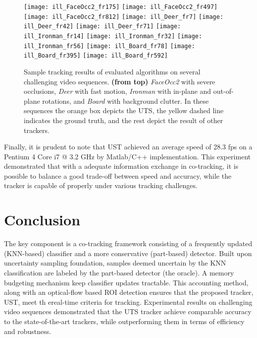 \documentclass[conference,twoside]{IEEEtran}
\begin{document}
\begin{figure}[!t]
\centering
\texttt{[image: ill\_FaceOcc2\_fr175]}
\texttt{[image: ill\_FaceOcc2\_fr497]}
\texttt{[image: ill\_FaceOcc2\_fr812]}
\texttt{[image: ill\_Deer\_fr7]}
\texttt{[image: ill\_Deer\_fr42]}
\texttt{[image: ill\_Deer\_fr71]}
\texttt{[image: ill\_Ironman\_fr14]}
\texttt{[image: ill\_Ironman\_fr32]}
\texttt{[image: ill\_Ironman\_fr56]}
\texttt{[image: ill\_Board\_fr78]}
\texttt{[image: ill\_Board\_fr395]}
\texttt{[image: ill\_Board\_fr592]}
\caption{Sample tracking results of evaluated algorithms on several challenging video sequences. \textbf{(from top)} \textit{FaceOcc2} with severe occlusions, \textit{Deer} with fast motion, \textit{Ironman} with in-plane and out-of-plane rotations, and \textit{Board} with background clutter.  In these sequences the orange box depicts the UTS, the yellow dashed line indicates the ground truth, and the rest depict the result of other trackers.}
\label{fig:eval_qual}
\vspace{-0.7 cm}
\end{figure}

Finally, it is prudent to note that UST achieved an average speed of 28.3 fps on a Pentium 4 Core i7 @ 3.2 GHz by Matlab/C++ implementation.%
This experiment demonstrated that with a adequate information exchange in co-tracking, it is possible to balance a good trade-off between speed and accuracy, while the tracker is capable of properly under various tracking challenges.

\section{Conclusion}
\label{sect:conclusion}
The key component is a co-tracking framework consisting of a frequently updated (KNN-based) classifier and a more conservative (part-based) detector. Built upon uncertainty sampling foundation, samples deemed uncertain by the KNN classification are labeled by the part-based detector (the oracle). A memory budgeting mechanism keep classifier updates tractable. This accounting method, along with an optical-flow based ROI detection ensures that the proposed tracker, UST, meet th ereal-time criteria for tracking. Experimental results on challenging video sequences demonstrated that the UTS tracker achieve comparable accuracy to the state-of-the-art trackers, while outperforming them in terms of efficiency and robustness.








\end{document}
